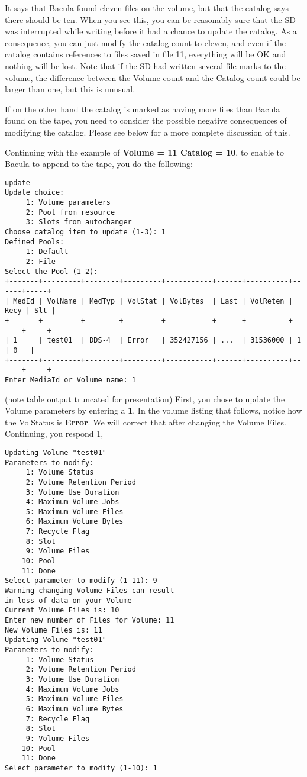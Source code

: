 It says that Bacula found eleven files on the volume, but that the catalog
says there should be ten. When you see this, you can be reasonably sure that
the SD was interrupted while writing before it had a chance to update the
catalog. As a consequence, you can just modify the catalog count to eleven,
and even if the catalog contains references to files saved in file 11,
everything will be OK and nothing will be lost. Note that if the SD had
written several file marks to the volume, the difference between the Volume
count and the Catalog count could be larger than one, but this is unusual.

If on the other hand the catalog is marked as having more files than Bacula
found on the tape, you need to consider the possible negative consequences of
modifying the catalog. Please see below for a more complete discussion of
this.

Continuing with the example of {\bf Volume = 11 Catalog = 10}, to enable to
Bacula to append to the tape, you do the following:

\footnotesize
\begin{verbatim}
update
Update choice:
     1: Volume parameters
     2: Pool from resource
     3: Slots from autochanger
Choose catalog item to update (1-3): 1
Defined Pools:
     1: Default
     2: File
Select the Pool (1-2):
+-------+---------+--------+---------+-----------+------+----------+------+-----+
| MedId | VolName | MedTyp | VolStat | VolBytes  | Last | VolReten | Recy | Slt |
+-------+---------+--------+---------+-----------+------+----------+------+-----+
| 1     | test01  | DDS-4  | Error   | 352427156 | ...  | 31536000 | 1    | 0   |
+-------+---------+--------+---------+-----------+------+----------+------+-----+
Enter MediaId or Volume name: 1
\end{verbatim}
\normalsize

(note table output truncated for presentation) First, you chose to update the
Volume parameters by entering a {\bf 1}. In the volume listing that follows,
notice how the VolStatus is {\bf Error}. We will correct that after changing
the Volume Files. Continuing, you respond 1,

\footnotesize
\begin{verbatim}
Updating Volume "test01"
Parameters to modify:
     1: Volume Status
     2: Volume Retention Period
     3: Volume Use Duration
     4: Maximum Volume Jobs
     5: Maximum Volume Files
     6: Maximum Volume Bytes
     7: Recycle Flag
     8: Slot
     9: Volume Files
    10: Pool
    11: Done
Select parameter to modify (1-11): 9
Warning changing Volume Files can result
in loss of data on your Volume
Current Volume Files is: 10
Enter new number of Files for Volume: 11
New Volume Files is: 11
Updating Volume "test01"
Parameters to modify:
     1: Volume Status
     2: Volume Retention Period
     3: Volume Use Duration
     4: Maximum Volume Jobs
     5: Maximum Volume Files
     6: Maximum Volume Bytes
     7: Recycle Flag
     8: Slot
     9: Volume Files
    10: Pool
    11: Done
Select parameter to modify (1-10): 1
\end{verbatim}
\normalsize

